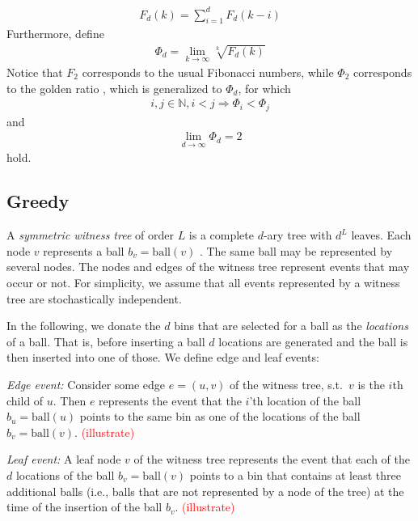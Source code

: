 \documentclass[a4paper,12pt]{article}
\newcommand\todo[1]{\textcolor{red}{(#1)}}
\begin{document}
\begin{align}
F_d(k) = \sum_{i=1}^{d}F_d(k-i)
\end{align}
Furthermore, define 
\begin{align}
\Phi_d = \lim_{k \rightarrow \infty} \sqrt[k]{F_d(k)}
\end{align}
Notice that $F_2$ corresponds to the usual Fibonacci numbers, while $\Phi_2 $ corresponds to the golden ratio \cite{Knuth73}, which is generalized to $\Phi_d$, for which 
\begin{align}
i, j \in \mathbb{N}, i < j \Rightarrow \Phi_i < \Phi_j
\end{align}
and 
\begin{align}
\lim_{d\rightarrow \infty} \Phi_d = 2
\end{align}
hold.

\subsection{Greedy}
\label{sec:analysis:greedy}
A \emph{symmetric witness tree} of order $L$ is a complete $d$-ary tree with $d^{L}$ leaves. Each node $v$ represents a ball $b_v = \mathrm{ball}(v)$ . The same ball may be represented by several nodes. The nodes and edges of the witness tree represent events that may occur or not. For simplicity, we assume that all events represented by a witness tree are stochastically independent.  

In the following, we donate the $d$ bins that are selected for a ball as the \emph{locations} of a ball. That is, before inserting a ball $d$ locations are generated and the ball is then inserted into one of those. We define edge and leaf events:
\begin{compactitem}
\item \emph{Edge event:} Consider some edge $e = (u,v)$ of the witness tree, s.t.~$v$ is the $i$th child of $u$. Then $e$ represents the event that the $i$'th location of the ball $b_u = \mathrm{ball}(u)$ points to the same bin as one of the locations of the ball $b_v = \mathrm{ball}(v)$. 
\todo{illustrate}
\item \emph{Leaf event:} A leaf node $v$ of the witness tree represents the event that each of the $d$ locations of the ball $b_v = \mathrm{ball}(v)$ points to a bin that contains at least three additional balls (i.e., balls that are not represented by a node of the tree) at the time of the insertion of the ball $b_v$.
\todo{illustrate}
\end{compactitem}
\end{document}
